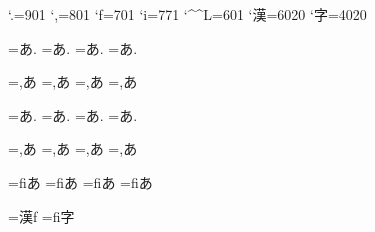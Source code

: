 \prebreakpenalty`.=901
\postbreakpenalty`,=801
\prebreakpenalty`f=701
\postbreakpenalty`i=771
\postbreakpenalty`\^^L=601
\postbreakpenalty`漢=6020
\prebreakpenalty`字=4020



=\hbox{あ.\showlists}%
=\hbox{{あ}.\showlists}%
=\hbox{あ{.}\showlists}%
=\hbox{{あ}{.}\showlists}%

=\hbox{,あ\showlists}%
=\hbox{,{あ}\showlists}%
=\hbox{{,}あ\showlists}%
=\hbox{{,}{あ}\showlists}%

{\ybaselineshift=1pt
=\hbox{あ.\showlists}%
=\hbox{{あ}.\showlists}%
=\hbox{あ{.}\showlists}%
=\hbox{{あ}{.}\showlists}%

=\hbox{,あ\showlists}%
=\hbox{,{あ}\showlists}%
=\hbox{{,}あ\showlists}%
=\hbox{{,}{あ}\showlists}%

=\hbox{fiあ\showlists}%
=\hbox{fi{あ}\showlists}%
=\hbox{{fi}あ\showlists}%
=\hbox{{fi}{あ}\showlists}%
}


=\hbox{漢f\showlists} %
=\hbox{fi字\showlists}%



\bye